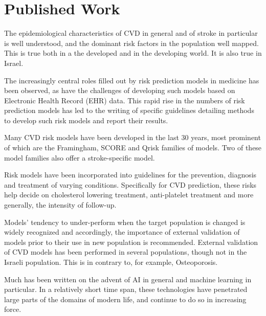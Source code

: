 \documentclass[a4paper,12pt]{article}
\begin{document}
	\section{Published Work}
	
	The epidemiological characteristics of CVD in general and of stroke in particular is well understood\cite{Koton2014,Vangen-Loenne2017}, and the dominant risk factors in the population well mapped\cite{Yusuf2004,ODonnell2016}. This is true both in a the developed and in the developing world\cite{Lozano2012}. It is also true in Israel\cite{ICDC2017}.
	
	The increasingly central roles filled out by risk prediction models in medicine has been observed\cite{Moons2009}, as have the challenges of developing such models based on Electronic Health Record (EHR) data\cite{Goldstein2016,Goldstein2017}. This rapid rise in the numbers of risk prediction models has led to the writing of specific guidelines detailing methods to develop such risk models and report their results\cite{Collins2015}.
	
	Many CVD risk models have been developed in the last 30 years, most prominent of which are the Framingham\cite{Wilson1998,NationalCholesterolEducationProgramNCEPExpertPanelonDetection2002,DAgostino2008,Goff2014}, SCORE\cite{Conroy2003} and Qrisk\cite{Hippisley-Cox2007,Hippisley-Cox2008} families of models.	Two of these model families also offer a stroke-specific model\cite{Wolf1991,DAgostino1994,Hippisley-Cox2013}.
	
	Risk models have been incorporated into guidelines for the prevention, diagnosis and treatment of varying conditions. Specifically for CVD prediction, these risks help decide on cholesterol lowering treatment, anti-platelet treatment and more generally, the intensity of follow-up\cite{NationalCholesterolEducationProgramNCEPExpertPanelonDetection2002,Graham2007,Goff2014,Bibbins-Domingo2016}.
	
	Models' tendency to under-perform when the target population is changed is widely recognized\cite{DAgostino2001,Bastuji-Garin2002,DeFilippis2015} and accordingly, the importance of external validation of models prior to their use in new population is recommended\cite{Moons2012}. External validation of CVD models has been performed in several populations\cite{DAgostino2001,Bastuji-Garin2002,DeFilippis2015}, though not in the Israeli population\cite{Bitzur2015}. This is in contrary to, for example, Osteoporosis\cite{Dagan2017}.
	
	Much has been written on the advent of AI in general and machine learning in particular. In a relatively short time span, these technologies have penetrated large parts of the domains of modern life, and continue to do so in increasing force\cite{Ng2017}.
	
\end{document}
